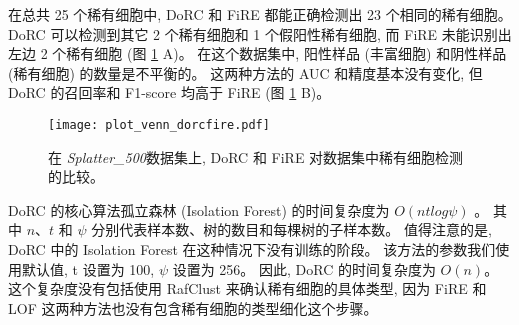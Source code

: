 在总共 25 个稀有细胞中, DoRC 和 FiRE 都能正确检测出 23 个相同的稀有细胞。
DoRC 可以检测到其它 2 个稀有细胞和 1 个假阳性稀有细胞,
而 FiRE 未能识别出左边 2 个稀有细胞 (图 \ref{fig:simulate:venn_auc_f1} A)。
在这个数据集中, 阳性样品 (丰富细胞) 和阴性样品 (稀有细胞) 的数量是不平衡的。
这两种方法的 AUC 和精度基本没有变化,
但 DoRC 的召回率和 F1-score 均高于 FiRE (图 \ref{fig:simulate:venn_auc_f1} B)。
\begin{figure}[!htbp]
    \centering
    \texttt{[image: plot\_venn\_dorcfire.pdf]}
    \caption{
    在 \textit{Splatter\_500}数据集上, DoRC 和 FiRE 对数据集中稀有细胞检测的比较。
    }
    \label{fig:simulate:venn_auc_f1}
\end{figure}

DoRC 的核心算法孤立森林 (Isolation Forest) 的时间复杂度为 $O(ntlog\psi)$ \cite{liu2008isolation}。
其中 $n$、$t$ 和 $\psi$ 分别代表样本数、树的数目和每棵树的子样本数。
值得注意的是, DoRC 中的 Isolation Forest 在这种情况下没有训练的阶段。
该方法的参数我们使用默认值, t 设置为 100, $\psi$ 设置为 256。
因此, DoRC 的时间复杂度为 $O(n)$。
这个复杂度没有包括使用 RafClust 来确认稀有细胞的具体类型,
因为 FiRE 和 LOF 这两种方法也没有包含稀有细胞的类型细化这个步骤。

